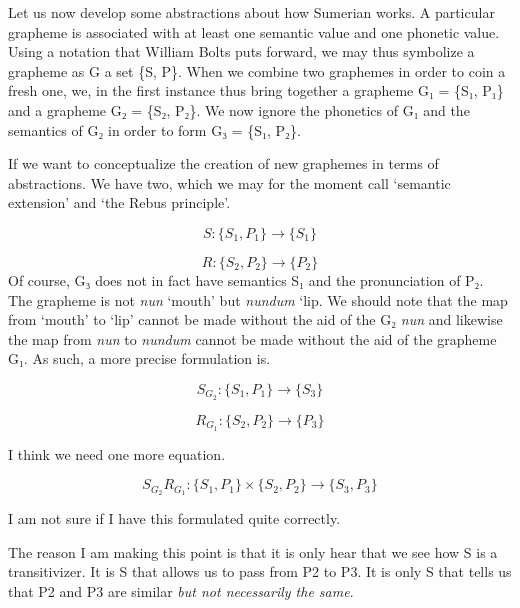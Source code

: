 Let us now develop some abstractions about how Sumerian works. 
A particular grapheme is associated with at least one semantic value and one phonetic value. 
Using a notation that William Bolts puts forward, we may thus symbolize a grapheme as G a set \{S, P\}. 
When we combine two graphemes in order to coin a fresh one, we, in the first instance thus bring together a grapheme G₁ = \{S₁, P₁\} and a grapheme G₂ = \{S₂, P₂\}. We now ignore the phonetics of G₁ and the semantics of  G₂ in order to form 
G₃ = \{S₁, P₂\}. 


If we want to conceptualize the creation of new graphemes in terms of abstractions. We have two, which we may for the moment call `semantic extension' and `the Rebus principle'. 

\begin{equation}
S: \{S_1, P_1\} \rightarrow \{S_1\} 
\end{equation}

\begin{equation}
R: \{S_2, P_2\} \rightarrow \{P_2\} 
\end{equation}
Of course, G₃ does not in fact have semantics S₁ and the pronunciation of P₂. 
The grapheme 
{} 
is not \textit{nun} `mouth' but \textit{nundum} `lip. 
We should note that the map from `mouth' to `lip'  cannot be made without the aid of the G₂  \textit{nun} and likewise the map from \textit{nun} to \textit{nundum} cannot be made without the aid of the grapheme G₁.  As such, a more precise formulation is. 

\begin{equation}
S_{G_2}: \{S_1, P_1\} \rightarrow \{S_3\} 
\end{equation}

\begin{equation}
R_{G_1}: \{S_2, P_2\} \rightarrow \{P_3\} 
\end{equation}

I think we need one more equation. 

\begin{equation}
S_{G_2}R_{G_1}: \{S_1, P_1\}  \times 
 \{S_2, P_2\} \rightarrow 
\{S_3, P_3\} 
\end{equation}

I am not sure if I have this formulated quite correctly. 

The reason I am making this point is that it is only hear that we see how S is a transitivizer. It is S that allows us to pass from P2 to P3. It is only S that tells us that P2 and P3 are similar \textit{but not necessarily the same}. 

